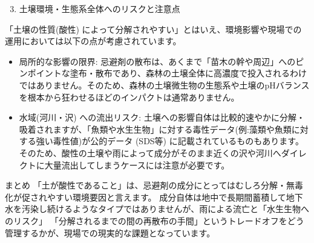 \documentclass[a4paper, 11pt]{jsarticle}
\begin{document}
\begin{enumerate}
    \setcounter{enumi}{2}
    \item 土壌環境・生態系全体へのリスクと注意点
\end{enumerate}
「土壌の性質(酸性) によって分解されやすい」とはいえ、環境影響や現場での運用においては以下の点が考慮されています。
\begin{itemize}
    \item 局所的な影響の限界: 忌避剤の散布は、あくまで「苗木の幹や周辺」へのピンポイントな塗布・散布であり、森林の土壌全体に高濃度で投入されるわけではありません。そのため、森林の土壌微生物の生態系や土壌のpHバランスを根本から狂わせるほどのインパクトは通常ありません。
    \item 水域(河川・沢) への流出リスク: 土壌への影響自体は比較的速やかに分解・吸着されますが、「魚類や水生生物」に対する毒性データ(例:藻類や魚類に対する強い毒性値)が公的データ (SDS等) に記載されているものもあります。そのため、酸性の土壌や雨によって成分がそのまま近くの沢や河川へダイレクトに大量流出してしまうケースには注意が必要です\cite{ref21,ref26}。
\end{itemize}
まとめ
「土が酸性であること」は、忌避剤の成分にとってはむしろ分解・無毒化が促されやすい環境要因と言えます。
成分自体は地中で長期間蓄積して地下水を汚染し続けるようなタイプではありませんが、雨による流亡と「水生生物へのリスク」 「分解されるまでの間の再散布の手間」というトレードオフをどう管理するかが、現場での現実的な課題となっています。
\end{document}
